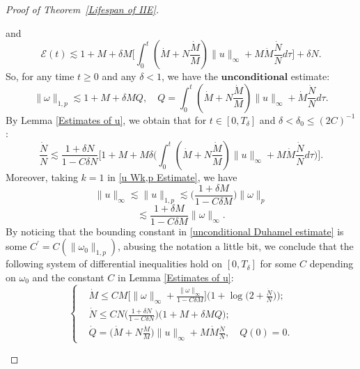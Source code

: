 \documentclass[12pt,letterpaper]{article}
\theoremstyle{plain}
\begin{document}
\begin{proof}[Proof of Theorem~\ref{Lifespan of IIE}]
\begin{itemize}
\begin{equation*}
\end{equation*}
and 
\begin{equation}\label{Energy norm of IIE}
\mathcal E(t)\lesssim  1+M +\delta M\Big[\int_0^t (\dot M+N\frac{\dot M}{M})\lVert u\rVert_\infty+M\dot M \frac{\dot N}{N}d\tau\Big]+\delta N.
\end{equation}
So, for any time $t\ge 0$ and any $\delta<1$, we have the $\mathbf{unconditional}$ estimate:
\begin{equation}\label{unconditional Duhamel estimate}
    \lVert\omega\rVert_{1,p}\lesssim 1+M+  \delta MQ,\quad Q=\int_0^t (\dot M+N\frac{\dot M}{M})\lVert u\rVert_\infty+\dot M \frac{\dot N}{N}d\tau .
\end{equation}
By Lemma \ref{Estimates of u}, we obtain that for $t\in [0,T_\delta]$ and $\delta<\delta_0\le (2C)^{-1}$:
\begin{equation*}
 \frac{\dot N}{N}\lesssim \frac{1+\delta N}{1-C\delta N} \bigg[1+M+  M\delta\Big(\int_0^t (\dot M+N\frac{\dot M}{M})\lVert u\rVert_\infty+M\dot M \frac{\dot N}{N}d\tau\Big) \bigg] . 
\end{equation*}
Moreover, taking $k=1$ in \eqref{u Wk,p Estimate}, we have
\begin{equation*}
\lVert u\rVert_\infty\lesssim \lVert u\rVert_{1,p}\lesssim \bigg(\frac{1+\delta M}{1-C\delta M}\bigg)\lVert\omega\rVert_p
\end{equation*}
\begin{equation*}
 \lesssim   \frac{1+\delta M}{1-C\delta M}\lVert\omega\rVert_\infty.
\end{equation*}
By noticing that the bounding constant in \eqref{unconditional Duhamel estimate} is some $C^\prime=C(\lVert\omega_0\rVert_{1,p})$, abusing the notation a little bit, we conclude that the following system of differential inequalities hold on $[0,T_\delta]$ for some $C$ depending on $\omega_0$ and the constant $C$ in Lemma \ref{Estimates of u}:
\begin{equation}\label{Differential Inequality System IIE}
\left\{
\begin{aligned}
&{\dot M}\le C  M\Big[\lVert\omega\rVert_\infty+\frac{\lVert\omega\rVert_\infty}{1-C\delta M}\Big]\Big(1+\log \Big(2+\frac{\dot N}{N}\Big)\Big);\\
&\dot N\le  CN\bigg(\frac{1+\delta N}{1-C\delta N}\bigg) \big(1+M+  \delta MQ \big);  \\
&\dot Q=  \Big(\dot M+N\frac{\dot M}{M}\Big)\lVert u\rVert_\infty+M\dot M \frac{\dot N}{N},\quad Q(0)=0 . 
\end{aligned}

\end{equation}
\end{itemize}
\end{proof}
\end{document}
